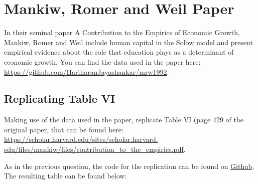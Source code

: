 \documentclass[a4paper,11pt]{article}
\begin{document}
\section{Mankiw, Romer and Weil Paper}
In their seminal paper A Contribution to the Empirics of Economic Growth, Mankiw, Romer and Weil include human capital in the Solow model and present empirical evidence about the role that education plays as a determinant of economic growth. You can find the data used in the paper here: \url{https://github.com/HariharanJayashankar/mrw1992}.
\begin{qbox}{\subsection{Replicating Table VI}}
Making use of the data used in the paper, replicate Table VI (page 429 of the original paper, that can be found here: \url{https://scholar.harvard.edu/sites/scholar.harvard. edu/files/mankiw/files/contribution_to_the_empirics.pdf}.
\end{qbox}
As in the previous question, the code for the replication can be found on \href{https://github.com/therealLucasPaul/AdvMacroeconomics1_2023}{Github}. The resulting table can be found below: 
\end{document}

